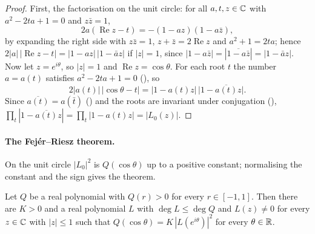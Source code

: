 \begin{proof}
\leanok
{}
First, the factorisation on the unit circle: for all $a, t, z \in \mathbb{C}$ with $a^2 - 2ta + 1 = 0$
and $z \bar z = 1$,
\[
  2a (\operatorname{Re} z - t) = -(1 - az)(1 - a \bar z) ,
\]
by expanding the right side with $z \bar z = 1$, $z + \bar z = 2 \operatorname{Re} z$ and
$a^2 + 1 = 2ta$; hence $2 |a| \, |\operatorname{Re} z - t| = |1 - az| \, |1 - \bar a z|$ if
$|z| = 1$, since $|1 - a \bar z| = |\overline{1 - a \bar z}| = |1 - \bar a z|$. Now let
$z = e^{i\theta}$, so $|z| = 1$ and $\operatorname{Re} z = \cos\theta$. For each root $t$ the
number $a = a(t)$ satisfies $a^2 - 2ta + 1 = 0$ (), so
\[
  2 |a(t)| \, |\cos\theta - t| = |1 - a(t) z| \, \bigl|1 - \overline{a(t)} z\bigr| .
\]
Since $\overline{a(t)} = a(\bar t)$ () and the roots are invariant
under conjugation (),
$\prod_t |1 - \overline{a(t)} z| = \prod_t |1 - a(t) z| = |L_0(z)|$.
\end{proof}

\paragraph{The Fej\'er--Riesz theorem.}
On the unit circle $|L_0|^2$ is $Q(\cos\theta)$ up to a positive constant; normalising the
constant and the sign gives the theorem.

\begin{lemma}
\label{lem:daub-fejer-riesz-constant}
\leanok
Let $Q$ be a real polynomial with $Q(r) > 0$ for every $r \in [-1, 1]$. Then there are $K > 0$
and a real polynomial $L$ with $\deg L \leq \deg Q$ and $L(z) \neq 0$ for every $z \in \mathbb{C}$ with
$|z| \leq 1$ such that $Q(\cos\theta) = K \, |L(e^{i\theta})|^2$ for every $\theta \in \mathbb{R}$.
\end{lemma}

